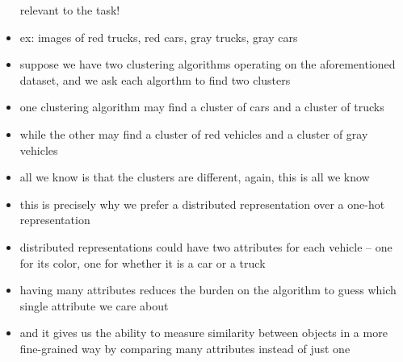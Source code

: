 \documentclass[11pt, twocolumn]{report}
\begin{document}
\begin{itemize}
    relevant to the task!
  \item ex: images of red trucks, red cars, gray trucks, gray cars
  \item suppose we have two clustering algorithms operating on the
    aforementioned dataset, and we ask each algorthm to find two clusters
  \item one clustering algorithm may find a cluster of cars and a cluster of
    trucks
  \item while the other may find a cluster of red vehicles and a cluster of
    gray vehicles
  \item all we know is that the clusters are different, again, this is all we
    know
  \item this is precisely why we prefer a distributed representation over a
    one-hot representation
  \item distributed representations could have two attributes for each vehicle
    -- one for its color, one for whether it is a car or a truck
  \item having many attributes reduces the burden on the algorithm to guess
    which single attribute we care about
  \item and it gives us the ability to measure similarity between objects in a
    more fine-grained way by comparing many attributes instead of just one
\end{itemize}
\end{document}
